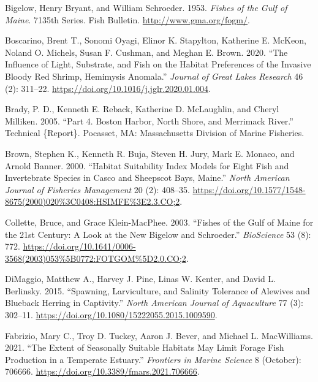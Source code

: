 \documentclass[
]{book}
\newlength{\cslhangindent}
\newlength{\cslentryspacingunit} %
\newenvironment{CSLReferences}[2] %
 {%
  \setlength{\parindent}{0pt}
  \ifodd #1
  \let\oldpar\par
  \def\par{\hangindent=\cslhangindent\oldpar}
  \fi
  \setlength{\parskip}{#2\cslentryspacingunit}
 }%
 {}
\begin{document}
\begin{CSLReferences}{1}{0}
\leavevmode{}%
Bigelow, Henry Bryant, and William Schroeder. 1953. \emph{Fishes of the {Gulf} of {Maine}}. 7135th Series. Fish Bulletin. \url{http://www.gma.org/fogm/}.

\leavevmode{}%
Boscarino, Brent T., Sonomi Oyagi, Elinor K. Stapylton, Katherine E. McKeon, Noland O. Michels, Susan F. Cushman, and Meghan E. Brown. 2020. {``The Influence of Light, Substrate, and Fish on the Habitat Preferences of the Invasive Bloody Red Shrimp, {Hemimysis} Anomala.''} \emph{Journal of Great Lakes Research} 46 (2): 311--22. \url{https://doi.org/10.1016/j.jglr.2020.01.004}.

\leavevmode{}%
Brady, P. D., Kenneth E. Reback, Katherine D. McLaughlin, and Cheryl Milliken. 2005. {``Part 4. {Boston} {Harbor}, {North} {Shore}, and {Merrimack} {River}.''} Technical \{Report\}. Pocasset, MA: Massachusetts Division of Marine Fisheries.

\leavevmode{}%
Brown, Stephen K., Kenneth R. Buja, Steven H. Jury, Mark E. Monaco, and Arnold Banner. 2000. {``Habitat {Suitability} {Index} {Models} for {Eight} {Fish} and {Invertebrate} {Species} in {Casco} and {Sheepscot} {Bays}, {Maine}.''} \emph{North American Journal of Fisheries Management} 20 (2): 408--35. \url{https://doi.org/10.1577/1548-8675(2000)020\%3C0408:HSIMFE\%3E2.3.CO;2}.

\leavevmode{}%
Collette, Bruce, and Grace Klein-MacPhee. 2003. {``Fishes of the {Gulf} of {Maine} for the 21st {Century}: {A} {Look} at the {New} {Bigelow} and {Schroeder}.''} \emph{BioScience} 53 (8): 772. \url{https://doi.org/10.1641/0006-3568(2003)053\%5B0772:FOTGOM\%5D2.0.CO;2}.

\leavevmode{}%
DiMaggio, Matthew A., Harvey J. Pine, Linas W. Kenter, and David L. Berlinsky. 2015. {``Spawning, {Larviculture}, and {Salinity} {Tolerance} of {Alewives} and {Blueback} {Herring} in {Captivity}.''} \emph{North American Journal of Aquaculture} 77 (3): 302--11. \url{https://doi.org/10.1080/15222055.2015.1009590}.

\leavevmode{}%
Fabrizio, Mary C., Troy D. Tuckey, Aaron J. Bever, and Michael L. MacWilliams. 2021. {``The {Extent} of {Seasonally} {Suitable} {Habitats} {May} {Limit} {Forage} {Fish} {Production} in a {Temperate} {Estuary}.''} \emph{Frontiers in Marine Science} 8 (October): 706666. \url{https://doi.org/10.3389/fmars.2021.706666}.


\end{CSLReferences}
\end{document}
